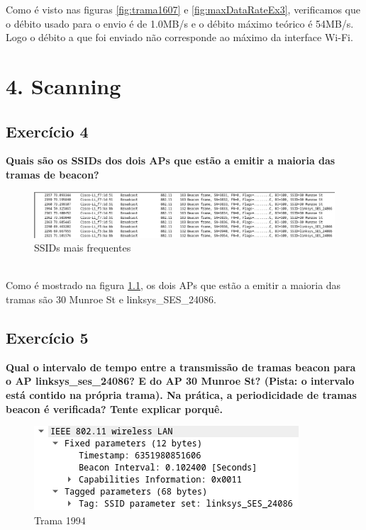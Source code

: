 \documentclass[a4paper]{report}
\begin{document}
Como é visto nas figuras \ref{fig:trama1607} e \ref{fig:maxDataRateEx3}, verificamos
que o débito usado para o envio é de 1.0MB/s e o débito máximo teórico é 54MB/s.
Logo o débito a que foi enviado não corresponde ao máximo da interface Wi-Fi.

\chapter{4. Scanning}
\section{Exercício 4}
\textbf{Quais são os SSIDs dos dois APs que estão a emitir a maioria das tramas
    de beacon?}\\

\begin{figure}[H]
    \centering 
    \includegraphics[width=\textwidth]{images/SSIDsEx4.png}  
    \caption{SSIDs mais frequentes}
    \label{fig:SSIDsEx4}
\end{figure}\\

Como é mostrado na figura \ref{fig:SSIDsEx4}, os dois APs que estão a emitir a
maioria das tramas são 30 Munroe St e linksys\_SES\_24086.

\section{Exercício 5}
\textbf{Qual o intervalo de tempo entre a transmissão de tramas beacon para o AP
    linksys\_ses\_24086? E do AP 30 Munroe St? (Pista: o intervalo está contido na
    própria trama). Na prática, a periodicidade de tramas beacon é verificada?
    Tente explicar porquê.}\\

\begin{figure}[H]
    \centering 
    \includegraphics[width=\textwidth]{images/tramaLinkEx5.png}  
    \caption{Trama 1994}
    \label{fig:tramaLinkEx5}
\end{figure}\\
\end{document}
